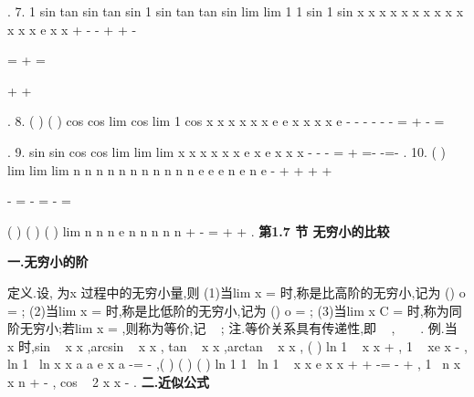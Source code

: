 . 
7.
1 sin
tan
sin
tan
sin
1 sin
tan
tan
sin
lim
lim 1
1 sin
1 sin
x
x
x
x
x
x
x
x
x
x
x
x
x
e
x
x
+
-
\cdots 
\cdots 
-
+
\to 
\to 
+
-




=
+
=




+
+




. 
8.
(
)
(
)
cos
cos
lim cos
lim 1
cos
x
x
x
x
x
x
e
e
x
x
x
x
e
-
-
-
\cdots 
\cdots 
-
-
-
\to 
\to 
=
+
-
=




. 
9.
sin
sin
cos
cos
lim
lim
lim
x
x
x
x
x
x
e
x
e
x
x
x
\to 
\to 
\to 
-
-
-
=
+
=-
-=-
. 
10.
(
)
lim
lim
lim
n n
n
n
n
n
n
n
n
n
n
e
e
e
n
e
n
e
-
+
+
+
+
\to \infty 
\to \infty 
\to \infty 






-
=
\cdots 
-
=
-
=














(
)
(
)
(
)
lim
n n
n
e
n
n n
n n
+
\to \infty 
-
\cdots 
\cdots 
=
+
+
. 
\vspace{6pt}
{\large \bfseries \textcolor{lyred}{第1.7 节 无穷小的比较}}

\vspace{4pt}
{\bfseries \textcolor{lyred}{一.无穷小的阶}}

\textcolor{lyred}{定义}.设\alpha , \beta 为x \to \Omega 过程中的无穷小量,则 
(1)当lim
x
\beta 
\alpha 
\to 
=
\Omega 
时,称\beta 是比\alpha \textcolor{lyred}{高阶的无穷小},记为
()
o
\beta 
\alpha 
=
; 
(2)当lim
x
\beta 
\alpha 
\to 
=\infty 
\Omega 
时,称\beta 是比\alpha \textcolor{lyred}{低阶的无穷小},记为
()
o
\alpha 
\beta 
=
; 
(3)当lim
x
C
\beta 
\alpha 
\to 
=
\neq 
\Omega 
时,称为\textcolor{lyred}{同阶无穷小};若lim
x
\beta 
\alpha 
\to 
=
\Omega 
,则称为\textcolor{lyred}{等价},记
~
\beta 
\alpha ; 
\textcolor{lyred}{注}.等价关系具有\textcolor{lyred}{传递性},即
~
\alpha 
\beta ,
~
~
\beta 
\gamma 
\alpha 
\gamma 
\Rightarrow 
. 
\textcolor{lyred}{例}.当
x \to 
时,sin
~
x
x ,arcsin
~
x
x , tan
~
x
x ,arctan
~
x
x ,
(
)
ln 1
~
x
x
+
,\textcolor{lyred}{ }
1 ~
xe
x
-
,
ln
1~
ln
x
x
a
a
e
x
a
-=
-
,(
)
(
)
(
)
ln 1
1~
ln 1
~
x
x
e
x
x
\alpha 
\alpha 
\alpha 
\alpha 
+
+
-=
-
+
, 
1~
n
x
x
n
+
-
,
cos
~ 2
x
x
-
. 
\vspace{4pt}
{\bfseries \textcolor{lyred}{二.近似公式}}

